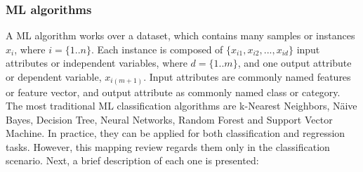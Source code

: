 \subsubsection{ML algorithms}
A ML algorithm works over a dataset, which contains many samples or instances $x_{i}$, where $i = \{1..n\}$. Each instance is composed of $\{x_{i1}, x_{i2},...,x_{id}\}$ input attributes or independent variables, where $d = \{1..m\}$, and one output attribute or dependent variable, $x_{i(m+1)}$.  Input attributes are commonly named features or feature vector, and output attribute as commonly named class or category. The most traditional ML classification algorithms are k-Nearest Neighbors, Näive Bayes, Decision Tree, Neural Networks, Random Forest and Support Vector Machine. In practice, they can be applied for both classification and regression tasks. However, this mapping review regards them only in the classification scenario. Next, a brief description of each one is presented\cite{Marsland:2014}:

